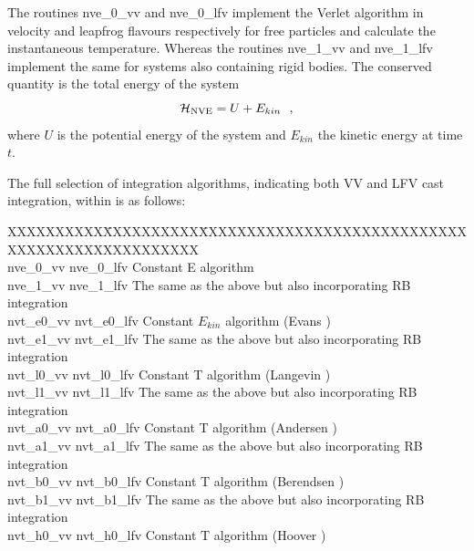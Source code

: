 The routines {\sc nve\_0\_vv} and {\sc nve\_0\_lfv} implement the
Verlet algorithm in velocity and leapfrog
flavours respectively for free particles and calculate the
instantaneous temperature.  Whereas the routines {\sc nve\_1\_vv} and
{\sc nve\_1\_lfv} implement the same for systems also containing
rigid bodies.  The conserved quantity is the total energy of the system
\begin{equation}
{\cal H}_{\rm NVE} = U + E_{kin}~~,
\end{equation}
where $U$ is the potential energy of the system and $E_{kin}$ the
kinetic energy at time $t$.

The full selection of integration algorithms, indicating both VV and
LFV cast integration, within \D is as follows:

\begin{tabbing}
XXXXXXXXXX\=XXXXXXXXXX\=XXXXXXXXXXXXXXXXXXXXXXXXXXXXXXXXXXXXXXXXXXXXXXXX\kill\\
{\sc nve\_0\_vv}  \> {\sc nve\_0\_lfv}  \> Constant E algorithm \\
{\sc nve\_1\_vv}  \> {\sc nve\_1\_lfv}  \> The same as the above but also incorporating RB integration \\
{\sc nvt\_e0\_vv} \> {\sc nvt\_e0\_lfv} \> Constant $E_{kin}$ algorithm (Evans \cite{evans-84a}) \\
{\sc nvt\_e1\_vv} \> {\sc nvt\_e1\_lfv} \> The same as the above but also incorporating RB integration \\
{\sc nvt\_l0\_vv} \> {\sc nvt\_l0\_lfv} \> Constant T algorithm (Langevin \cite{adelman-76a}) \\
{\sc nvt\_l1\_vv} \> {\sc nvt\_l1\_lfv} \> The same as the above but also incorporating RB integration \\
{\sc nvt\_a0\_vv} \> {\sc nvt\_a0\_lfv} \> Constant T algorithm (Andersen \cite{andersen-79a}) \\
{\sc nvt\_a1\_vv} \> {\sc nvt\_a1\_lfv} \> The same as the above but also incorporating RB integration \\
{\sc nvt\_b0\_vv} \> {\sc nvt\_b0\_lfv} \> Constant T algorithm (Berendsen \cite{berendsen-84a}) \\
{\sc nvt\_b1\_vv} \> {\sc nvt\_b1\_lfv} \> The same as the above but also incorporating RB integration \\
{\sc nvt\_h0\_vv} \> {\sc nvt\_h0\_lfv} \> Constant T algorithm (Hoover \cite{hoover-85a}) \\

\end{tabbing}
